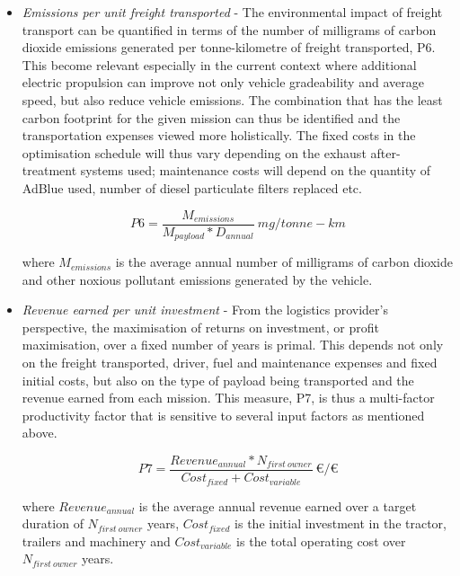 \documentclass[ExampleMasters.tex]{subfiles}
\begin{document}
\begin{itemize}
			\item \textit{Emissions per unit freight transported} - The environmental impact of freight transport can be quantified in terms of the number of milligrams of carbon dioxide emissions generated per tonne-kilometre of freight transported, P6. This become relevant especially in the current context where additional electric propulsion can improve not only vehicle gradeability and average speed, but also reduce vehicle emissions. The combination that has the least carbon footprint for the given mission can thus be identified and the transportation expenses viewed more holistically. The fixed costs in the optimisation schedule will thus vary depending on the exhaust after-treatment systems used; maintenance costs will depend on the quantity of AdBlue used, number of diesel particulate filters replaced etc.

			\begin{equation}
				P6 = \frac{M_{emissions}}{M_{payload}*D_{annual}}\  mg/tonne-km
			\end{equation}

			where $M_{emissions}$ is the average annual number of milligrams of carbon dioxide and other noxious pollutant emissions generated by the vehicle.

			\item \textit{Revenue earned per unit investment} - From the logistics provider's perspective, the maximisation of returns on investment, or profit maximisation, over a fixed number of years is primal. This depends not only on the freight transported, driver, fuel and maintenance expenses and fixed initial costs, but also on the type of payload being transported and the revenue earned from each mission. This measure, P7, is thus a multi-factor productivity factor that is sensitive to several input factors as mentioned above.

			\begin{equation}
				P7 = \frac{Revenue_{annual}*N_{first\ owner}}{Cost_{fixed} + Cost_{variable}}\ \euro/\euro
			\end{equation}

			where $Revenue_{annual}$ is the average annual revenue earned over a target duration of $N_{first\ owner}$ years, $Cost_{fixed}$ is the initial investment in the tractor, trailers and machinery and $Cost_{variable}$ is the total operating cost over $N_{first\ owner}$ years.

		\end{itemize}
\end{document}
